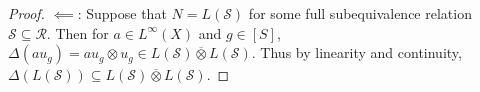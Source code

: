 \documentclass[12pt]{article}
\newcommand{\sub}{\subseteq}
\newcommand*\cls[1]{\overline{#1}}
\theoremstyle{definition}
\theoremstyle{plain}
\theoremstyle{remark}
\begin{document}
\begin{proof}
    \underline{$ \impliedby $}: Suppose that $ N = L(\mathcal{S}) $ for some full subequivalence relation $ \mathcal{S}\sub \mathcal{R} $. Then for $ a\in L^{\infty}(X) $ and $ g\in [S] $, $ \Delta (au_{g}) = au_{g} \otimes u_{g}\in L(\mathcal{S}) \cls{\otimes }L(\mathcal{S}) $. Thus by linearity and continuity, $ \Delta (L(\mathcal{S}))\sub L(\mathcal{S}) \cls{\otimes }L(\mathcal{S}) $.
    
\end{proof}


\printbibliography
\end{document}
